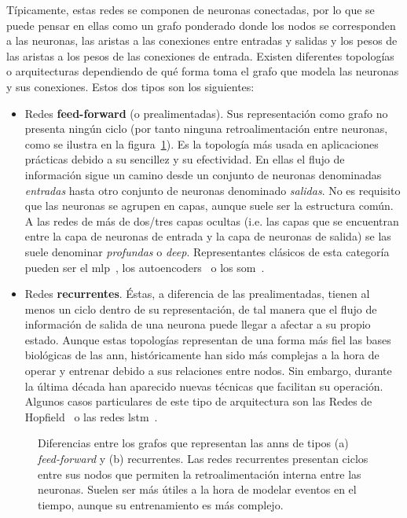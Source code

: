 Típicamente, estas redes se componen de neuronas conectadas, por lo que se puede pensar en ellas como un grafo ponderado donde los nodos se corresponden a las neuronas, las aristas a las conexiones entre entradas y salidas y los pesos de las aristas a los pesos de las conexiones de entrada. Existen diferentes topologías o arquitecturas dependiendo de qué forma toma el grafo que modela las neuronas y sus conexiones. Estos dos tipos son los siguientes:

\begin{itemize}
	\item Redes \textbf{feed-forward} (o prealimentadas). Sus representación como grafo no presenta ningún ciclo (por tanto ninguna retroalimentación entre neuronas, como se ilustra en la figura~\ref{fig:ff-vs-rnn}). Es la topología más usada en aplicaciones prácticas debido a su sencillez y su efectividad. En ellas el flujo de información sigue un camino desde un conjunto de neuronas denominadas \textit{entradas} hasta otro conjunto de neuronas denominado \textit{salidas}. No es requisito que las neuronas se agrupen en capas, aunque suele ser la estructura común. A las redes de más de dos/tres capas ocultas (i.e. las capas que se encuentran entre la capa de neuronas de entrada y la capa de neuronas de salida) se las suele denominar \textit{profundas} o \textit{deep}. Representantes clásicos de esta categoría pueden ser el \gls{mlp}~\cite{rumelhart1985learning}, los autoencoders~\cite{Hinton2006} o los \gls{som}~\cite{kohonen1998self}.
	\item Redes \textbf{recurrentes}. Éstas, a diferencia de las prealimentadas, tienen al menos un ciclo dentro de su representación, de tal manera que el flujo de información de salida de una neurona puede llegar a afectar a su propio estado. Aunque estas topologías representan de una forma más fiel las bases biológicas de las \gls{ann}, históricamente han sido más complejas a la hora de operar y entrenar debido a sus relaciones entre nodos. Sin embargo, durante la última década han aparecido nuevas técnicas que facilitan su operación. Algunos casos particulares de este tipo de arquitectura son las Redes de Hopfield~\cite{hopfield1982neural} o las redes \gls{lstm}~\cite{hochreiter1997long}.
\end{itemize}

\begin{figure}[t]
	\centering
	\qquad
	\caption[Diferencias entre toppologías de redes \textit{feed-forward} y \textit{recurrentes}]{Diferencias entre los grafos que representan las \acp{ann} de tipos (a) \textit{feed-forward} y (b) recurrentes. Las redes recurrentes presentan ciclos entre sus nodos que permiten la retroalimentación interna entre las neuronas. Suelen ser más útiles a la hora de modelar eventos en el tiempo, aunque su entrenamiento es más complejo.}
	\label{fig:ff-vs-rnn}
\end{figure}

